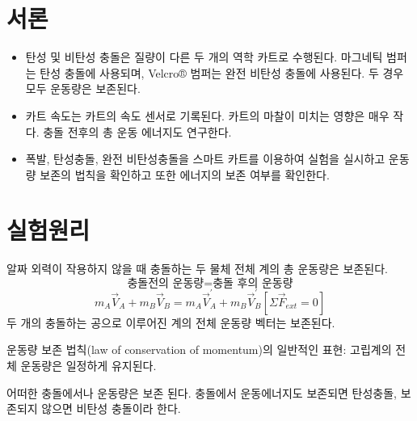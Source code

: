 \documentclass[12pt,a4paper]{article}
\begin{document}
\section{서론}
\begin{itemize}
    \item 탄성 및 비탄성 충돌은 질량이 다른 두 개의 역학 카트로 수행된다.
        마그네틱 범퍼는 탄성 충돌에 사용되며, Velcro® 범퍼는 완전 비탄성 충돌에
        사용된다. 두 경우 모두 운동량은 보존된다.
    \item 카트 속도는 카트의 속도 센서로 기록된다. 카트의 마찰이 미치는 영향은 매우
        작다. 충돌 전후의 총 운동 에너지도 연구한다.
    \item 폭발, 탄성충돌, 완전 비탄성충돌을 스마트 카트를 이용하여 실험을 실시하고
        운동량 보존의 법칙을 확인하고 또한 에너지의 보존 여부를 확인한다.
\end{itemize}
\section{실험원리}
알짜 외력이 작용하지 않을 때 충돌하는 두 물체 전체 계의 총 운동량은 보존된다.
$$\textrm{충돌전의 운동량} = \textrm{충돌 후의 운동량}$$
$$m_A\vec{V}_A+m_B\vec{V}_B = m_A\vec{V}_{A}^{'} + m_B\vec{V}_{B}^{'}
\left[ \Sigma \vec{F}_{ext} = 0 \right]$$
두 개의 충돌하는 공으로 이루어진 계의 전체 운동량 벡터는 보존된다.

운동량 보존 법칙(law of conservation of momentum)의 일반적인 표현: 고립계의 전체
운동량은 일정하게 유지된다.

어떠한 충돌에서나 운동량은 보존 된다. 충돌에서 운동에너지도 보존되면 탄성충돌,
보존되지 않으면 비탄성 충돌이라 한다.

\end{document}
